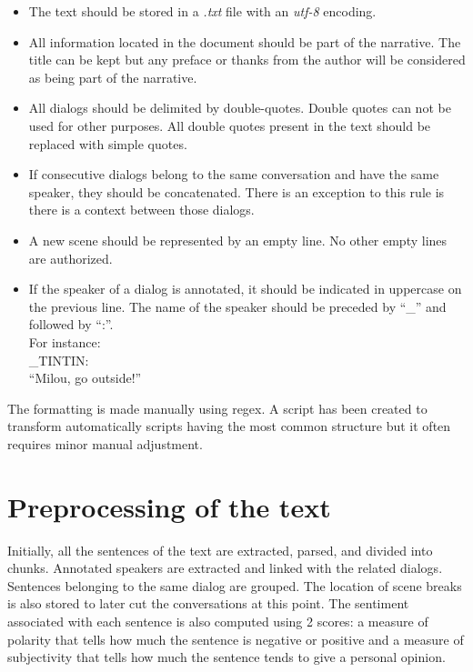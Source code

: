 \documentclass[a4paper, 12pt]{report}
\begin{document}
\begin{itemize}
\item The text should be stored in a \textit{.txt} file with an \textit{utf-8} encoding.
\item All information located in the document should be part of the narrative. The title can be kept but any preface or thanks from the author will be considered as being part of the narrative.
\item All dialogs should be delimited by double-quotes. Double quotes can not be used for other purposes. All double quotes present in the text should be replaced with simple quotes.
\item If consecutive dialogs belong to the same conversation and have the same speaker, they should be concatenated. There is an exception to this rule is there is a context between those dialogs.
\item A new scene should be represented by an empty line. No other empty lines are authorized.
\item If the speaker of a dialog is annotated, it should be indicated in uppercase on the previous line. The name of the speaker should be preceded by ``\_'' and followed by ``:''.\\
For instance: \\
\_TINTIN:\\
``Milou, go outside!''\\
\end{itemize}

The formatting is made manually using regex. A script has been created to transform automatically scripts having the most common structure but it often requires minor manual adjustment.

\section{Preprocessing of the text}
Initially, all the sentences of the text are extracted, parsed, and divided into chunks. Annotated speakers are extracted and linked with the related dialogs. Sentences belonging to the same dialog are grouped. The location of scene breaks is also stored to later cut the conversations at this point. The sentiment associated with each sentence is also computed using 2 scores: a measure of polarity that tells how much the sentence is negative or positive and a measure of subjectivity that tells how much the sentence tends to give a personal opinion.
\end{document}
